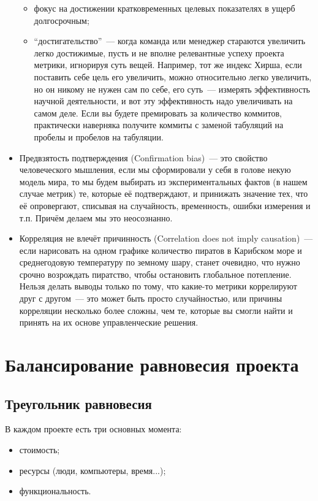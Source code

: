 \documentclass{../../text-style}
\begin{document}
\begin{itemize}
\begin{itemize}
        \item фокус на достижении кратковременных целевых показателях в ущерб долгосрочным;
        \item \enquote{достигательство}~--- когда команда или менеджер стараются увеличить легко достижимые, пусть и не вполне релевантные успеху проекта метрики, игнорируя суть вещей. Например, тот же индекс Хирша, если поставить себе цель его увеличить, можно относительно легко увеличить, но он никому не нужен сам по себе, его суть~--- измерять эффективность научной деятельности, и вот эту эффективность надо увеличивать на самом деле. Если вы будете премировать за количество коммитов, практически наверняка получите коммиты с заменой табуляций на пробелы и пробелов на табуляции.
    \end{itemize}
    \item Предвзятость подтверждения (Confirmation bias)~--- это свойство человеческого мышления, если мы сформировали у себя в голове некую модель мира, то мы будем выбирать из экспериментальных фактов (в нашем случае метрик) те, которые её подтверждают, и принижать значение тех, что её опровергают, списывая на случайность, временность, ошибки измерения и т.п. Причём делаем мы это неосознанно.
    \item Корреляция не влечёт причинность (Correlation does not imply causation)~--- если нарисовать на одном графике количество пиратов в Карибском море и среднегодовую температуру по земному шару, станет очевидно, что нужно срочно возрождать пиратство, чтобы остановить глобальное потепление. Нельзя делать выводы только по тому, что какие-то метрики коррелируют друг с другом~--- это может быть просто случайностью, или причины корреляции несколько более сложны, чем те, которые вы смогли найти и принять на их основе управленческие решения.
\end{itemize}

\section{Балансирование равновесия проекта}

\subsection{Треугольник равновесия}

В каждом проекте есть три основных момента:

\begin{itemize}
    \item стоимость;
    \item ресурсы (люди, компьютеры, время...);
    \item функциональность.
\end{itemize}
\end{document}
